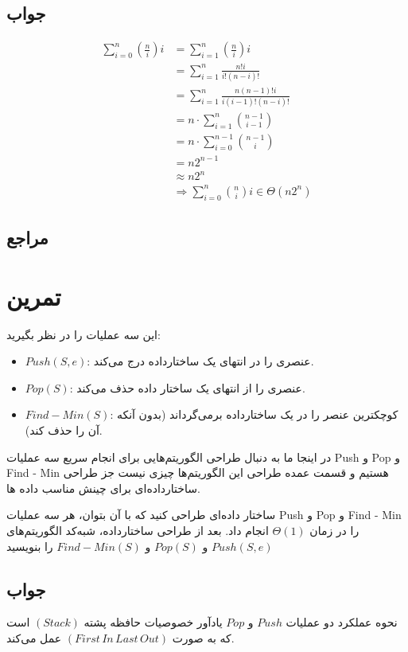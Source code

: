 \documentclass[]{article}
\begin{document}
\subsection*{جواب}
\begin{align}
    \sum_{i = 0}^n \left(\frac{n}{i}\right)i &= \sum_{i = 1}^n \left(\frac{n}{i}\right)i \\
    &= \sum_{i = 1}^n \frac{n!i}{i!(n-i)!} \\
    &= \sum_{i = 1}^n \frac{n(n-1)!i}{i(i-1)!(n-i)!} \\
    &= n \cdot \sum_{i = 1}^n \binom{n-1}{i-1} \\
    &= n \cdot \sum_{i = 0}^{n-1} \binom{n-1}{i} \\
    &= n2^{n-1} \\
    &\approx n2^n \\
    &\Rightarrow \sum_{i = 0}^n \binom{n}{i}i \in \Theta(n2^n)
\end{align}
\subsection*{مراجع}

\pagebreak
\section{تمرین}
این سه عملیات را در نظر بگیرید:
    \begin{itemize}
        \item $Push(S, e)$:
        عنصری را در انتهای یک ساختارداده درج می‌کند.
        \item $Pop(S)$:
        عنصری را از انتهای یک ساختار داده حذف می‌کند.
        \item $Find - Min(S)$:
        کوچکترین عنصر را در یک ساختارداده برمی‌گرداند (بدون آنکه آن را حذف کند).
    \end{itemize}
    در اینجا ما به دنبال طراحی الگوریتم‌هایی برای انجام سریع سه عملیات
    Push و 
    Pop و 
    Find - Min 
    هستیم و قسمت عمده طراحی این الگوریتم‌ها چیزی نیست جز طراحی ساختارداده‌ای برای چینش مناسب داده ها.

    ساختار داده‌ای طراحی کنید که با آن بتوان، هر سه عملیات
    Push و 
    Pop و 
    Find - Min 
    را در زمان
    $\Theta(1)$ 
    انجام داد.
    بعد از طراحی ساختارداده، شبه‌کد الگوریتم‌های
    $Push(S, e)$ و 
    $Pop(S)$ و 
    $Find - Min(S)$ 
    را بنویسید

\subsection{جواب}
نحوه عملکرد دو عملیات 
$Push$ و $Pop$
یادآور خصوصیات حافظه پشته 
$(Stack)$
است که به صورت 
$(First \, In \, Last \, Out)$
عمل می‌کند. 
\end{document}
